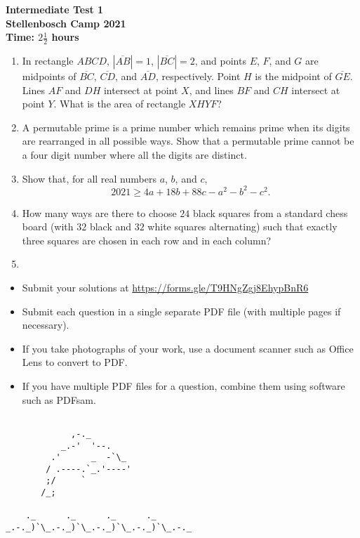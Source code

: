 \documentclass{article}
\begin{document}
\thispagestyle{empty}

\begin{center}
  \textbf{\Large Intermediate Test 1}
  \\ \vspace{1em}
  \textbf{\large Stellenbosch Camp 2021}
  \\ \vspace{1em}
  \textbf{\large Time: $2\frac{1}{2}$ hours}
\end{center}

\vspace{24pt}

\begin{enumerate}[1.]

\item %
In rectangle $ABCD$, $|\overline{AB}|=1$, $|\overline{BC}|=2$, and points $E$, $F$, and $G$ are midpoints of $\overline{BC}$, $\overline{CD}$, and $\overline{AD}$, respectively.
Point $H$ is the midpoint of $\overline{GE}$.
Lines $AF$ and $DH$ intersect at point $X$, and lines $BF$ and $CH$ intersect at point $Y$.
What is the area of rectangle $XHYF$?


\item %
A permutable prime is a prime number which remains prime when its digits are rearranged in all possible ways. Show that a permutable prime cannot be a four digit number where all the digits are distinct.

\item %
Show that, for all real numbers $a$, $b$, and $c$,
\[ 2021 \geq 4a + 18b + 88c - a^2 - b^2 - c^2. \]


\item %
How many ways are there to choose $24$ black squares from a standard chess board (with $32$ black and $32$ white squares alternating) such that exactly three squares are chosen in each row and in each column?


\item %

\end{enumerate}


\vfill
\begin{itemize}
	\item Submit your solutions at \href{https://forms.gle/T9HNgZgj8EhypBnR6}{https://forms.gle/T9HNgZgj8EhypBnR6}
	\item Submit each question in a single separate PDF file (with multiple pages if necessary).
	\item If you take photographs of your work, use a document scanner such as Office Lens to convert to PDF.
	\item If you have multiple PDF files for a question, combine them using software such as PDFsam.
\end{itemize}


\vfill

\centering
\begin{BVerbatim}

             ,-._
           _.-'  '--.
         .'      _  -`\_
        / .----.`_.'----'
        ;/     `
       /_;

    ._      ._      ._      ._
_.-._)`\_.-._)`\_.-._)`\_.-._)`\_.-._

\end{BVerbatim}
\end{document}

